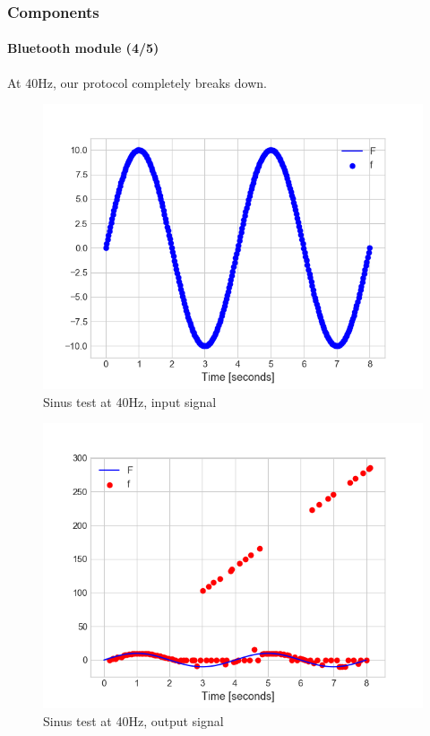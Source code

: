 \documentclass[10pt]{beamer}
\begin{document}

\begin{frame}
\frametitle{Components}
\framesubtitle{Bluetooth module (4/5)}
At 40Hz, our protocol completely breaks down.
\begin{multicols}{2}
\begin{figure}
\centering
\includegraphics[scale=0.4]{figures/sending-40hz.png}
\caption{Sinus test at 40Hz, input signal}
\end{figure}
\columnbreak
\begin{figure}
\centering
\includegraphics[scale=0.4]{figures/reception-40hz.png}
\caption{Sinus test at 40Hz, output signal}
\end{figure}
\end{multicols}
\end{frame}
\end{document}
